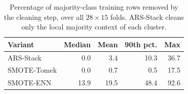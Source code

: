 \begin{table}[t]\centering\small
\caption{Percentage of majority-class training rows removed by the cleaning step, over all $28\times15$ folds. ARS-Stack cleans only the local majority context of each cluster.}
\label{tab:removed}
\begin{tabular}{lrrrr}
\toprule
Variant & Median & Mean & 90th pct. & Max \\
\midrule
ARS-Stack & 0.0 & 3.4 & 10.3 & 36.7 \\
SMOTE-Tomek & 0.0 & 0.7 & 0.5 & 17.5 \\
SMOTE-ENN & 13.9 & 19.5 & 48.4 & 92.6 \\
\bottomrule
\end{tabular}
\end{table}